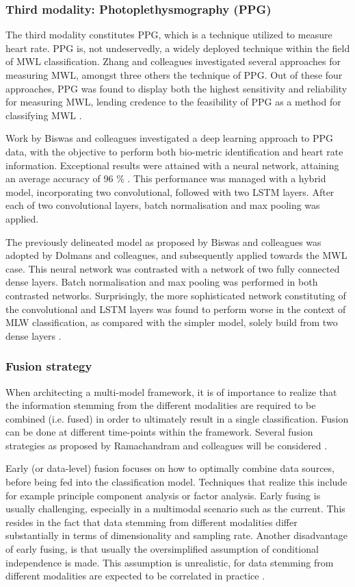 \documentclass[12pt]{article}
\begin{document}
\subsubsection{Third modality: Photoplethysmography (PPG)}
The third modality constitutes PPG, which is a technique utilized to measure heart rate. PPG is, not undeservedly, a widely deployed technique within the field of MWL classification. Zhang and colleagues investigated several approaches for measuring MWL, amongst three others the technique of PPG. Out of these four approaches, PPG was found to display both the highest sensitivity and reliability for measuring MWL, lending credence to the feasibility of PPG as a method for classifying MWL \cite{zhang2018evaluating}. 

Work by Biswas and colleagues investigated a deep learning approach to PPG data, with the objective to perform both bio-metric identification and heart rate information. Exceptional results were attained with a neural network, attaining an average accuracy of 96 \% \cite{biswas2019cornet}. This performance was managed with a hybrid model, incorporating two convolutional, followed with two LSTM layers. After each of two convolutional layers, batch normalisation and max pooling was applied. 

The previously delineated model as proposed by Biswas and colleagues was adopted by Dolmans and colleagues, and subsequently applied towards the MWL case. This neural network was contrasted with a network of two fully connected dense layers. Batch normalisation and max pooling was performed in both contrasted networks. Surprisingly, the more sophisticated network constituting of the convolutional and LSTM layers was found to perform worse in the context of MLW classification, as compared with the simpler model, solely build from two dense layers \cite{dolmans2020perceived}.   

\subsubsection{Fusion strategy}  
When architecting a multi-model framework, it is of importance to realize that the information stemming from the different modalities are required to be combined (i.e. fused) in order to ultimately result in a single classification. Fusion can be done at different time-points within the framework. Several fusion strategies as proposed by Ramachandram and colleagues will be considered \cite{ramachandram2017deep}.

Early (or data-level) fusion focuses on how to optimally combine data sources, before being fed into the classification model. Techniques that realize this include for example principle component analysis or factor analysis. Early fusing is usually challenging, especially in a multimodal scenario such as the current. This resides in the fact that data stemming from different modalities differ substantially in terms of dimensionality and sampling rate. Another disadvantage of early fusing, is that usually the oversimplified assumption of conditional independence is made. This assumption is unrealistic, for data stemming from different modalities are expected to be correlated in practice \cite{ramachandram2017deep}. 
\end{document}
